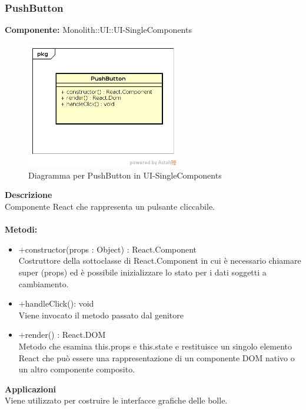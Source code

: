 \clearpage

\subsubsection{PushButton}
\textbf{Componente:}  Monolith::UI::UI-SingleComponents\\
   \FloatBarrier
   \begin{figure}[ht]
   \centering
   \includegraphics[width=0.6\textwidth]{img/single-PushButton}
   \caption{{Diagramma per PushButton in UI-SingleComponents}}
\end{figure}
\FloatBarrier
\textbf{Descrizione}\\
Componente React che rappresenta un pulsante cliccabile. \\\\
\textbf{Metodi:} \begin{itemize}\item +constructor(props : Object) : React.Component \\Costruttore della sottoclasse di React.Component in cui è necessario chiamare super (props) ed è possibile inizializzare lo stato per i dati soggetti a cambiamento.\item +handleClick(): void \\Viene invocato il metodo passato dal genitore\item +render() : React.DOM \\Metodo che esamina this.props e this.state e restituisce un singolo elemento React che può essere una rappresentazione di un componente DOM nativo o un altro componente composito.\end{itemize} 


\textbf{Applicazioni}\\
Viene utilizzato per costruire le interfacce grafiche delle bolle. 


\clearpage

